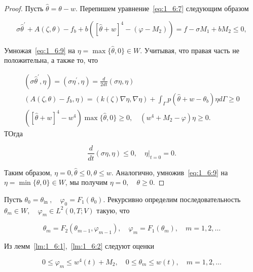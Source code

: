 \begin{proof}
    Пусть $\widehat{\theta}=\theta-w$.
    Перепишем уравнение~\eqref{eq:1_6:7} следующим образом

    \begin{equation}
        \label{eq:1_6:9}
        \sigma \widehat{\theta}^{\prime}+A(\zeta, \theta)-f_{b}
        +b\left([\widehat{\theta}+w]^{4}
        -\left(\varphi-M_{2}\right)\right)=f-\sigma M_{1}+b M_{2} \leq 0,
    \end{equation}

    Умножая~\eqref{eq:1_6:9} на $\eta=\max \{\widehat{\theta}, 0\} \in W$.
    Учитывая, что правая часть не положительна,  а также то, что

    \[
        \begin{gathered}
            \left(\sigma \widehat{\theta}^{\prime}, \eta\right)
            =\left(\sigma \eta^{\prime}, \eta\right)=\frac{d}{2 d t}(\sigma \eta, \eta) \\
            \left(A(\zeta, \theta)-f_{b}, \eta\right)
            =(k(\zeta) \nabla \eta, \nabla \eta)
            +\int_{\Gamma} p\left(\widehat{\theta}
            +w-\theta_{b}\right) \eta d \Gamma \geq 0 \\
            \left([\widehat{\theta}+w]^{4}-w^{4}\right) \max \{\widehat{\theta}, 0\} \geq 0,
            \quad\left(w^{4}+M_{2}-\varphi\right) \eta \geq 0.
        \end{gathered}
    \]
    ТОгда

    \[
        \frac{d}{d t}(\sigma \eta, \eta) \leq 0,\left.\quad \eta\right|_{t=0}=0.
    \]


    Таким образом, $\eta=0, \widehat{\theta} \leq 0, \theta \leq w$.
    Аналогично, умножив~\eqref{eq:1_6:9} на $\eta=\min \{\theta, 0\} \in W$,
    мы получим $\eta=0, \quad \theta \geq 0$.
\end{proof}

Пусть $\theta_{0}=\theta_{\text {in }}, \quad \varphi_{0}=F_{1}\left(\theta_{0}\right)$.
Рекурсивно определим последовательность
$\theta_{m} \in W, \quad \varphi_{m} \in L^{2}(0, T ; V)$ такую, что

\begin{equation}
    \label{eq:1_6:10}
    \theta_{m}=F_{2}\left(\theta_{m-1}, \varphi_{m-1}\right),
    \quad \varphi_{m}=F_{1}\left(\theta_{m}\right), \quad m=1,2, \ldots
\end{equation}

Из лемм~\ref{lm:1_6:1},~\ref{lm:1_6:2} следуют оценки

\begin{equation}
    \label{eq:1_6:11}
    0 \leq \varphi_{m} \leq w^{4}(t)+M_{2},
    \quad 0 \leq \theta_{m} \leq w(t), \quad m=1,2, \ldots
\end{equation}

